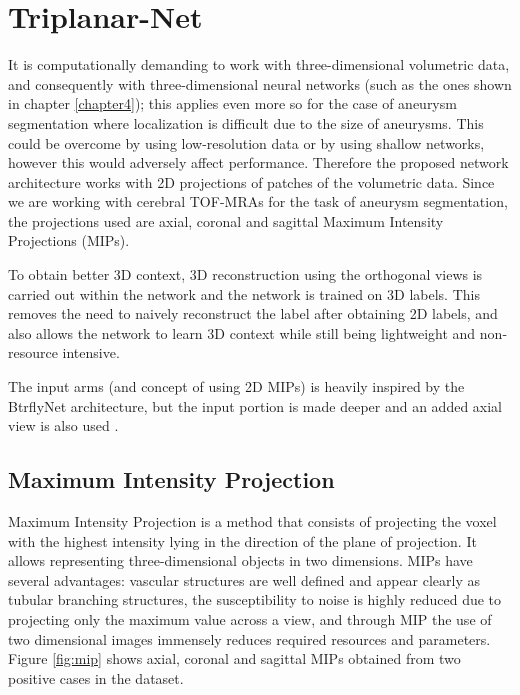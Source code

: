 \section{Triplanar-Net }
\label{chapter5}

It is computationally demanding to work with three-dimensional volumetric data, and consequently with three-dimensional neural networks (such as the ones shown in chapter \ref{chapter4}); this applies even more so for the case of aneurysm segmentation where localization is difficult due to the size of aneurysms. This could be overcome by using low-resolution data or by using shallow networks, however this would adversely affect performance. Therefore the proposed network architecture works with 2D projections of patches of the volumetric data. Since we are working with cerebral TOF-MRAs for the task of aneurysm segmentation, the projections used are axial, coronal and sagittal Maximum Intensity Projections (MIPs). 

To obtain better 3D context, 3D reconstruction using the orthogonal views is carried out within the network and the network is trained on 3D labels. This removes the need to naively reconstruct the label after obtaining 2D labels, and also allows the network to learn 3D context while still being lightweight and non-resource intensive. 

The input arms (and concept of using 2D MIPs) is heavily inspired by the BtrflyNet architecture, but the input portion is made deeper and an added axial view is also used \cite{sekuboyina2018}.  


\subsection{Maximum Intensity Projection}
Maximum Intensity Projection is a method that consists of projecting the voxel with the highest intensity lying in the direction of the plane of projection. It allows representing three-dimensional objects in two dimensions. MIPs have several advantages: vascular structures are well defined and appear clearly as tubular branching structures, the susceptibility to noise is highly reduced due to projecting only the maximum value across a view, and through MIP the use of two dimensional images immensely reduces required resources and parameters. Figure \ref{fig:mip} shows axial, coronal and sagittal MIPs obtained from two positive cases in the dataset. 

